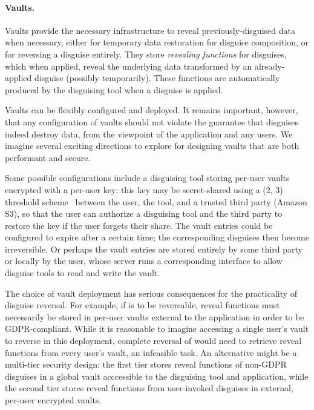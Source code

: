 
\paragraph{Vaults.}

Vaults provide the necessary infrastructure to reveal previously-disguised data when
necessary, either for temporary data restoration for disguise composition, or for reversing a disguise
entirely.
%
They store \emph{revealing functions} for disguises, which when applied, reveal the underlying
data transformed by an already-applied disguise (possibly temporarily). These functions are
automatically produced by the disguising tool when a disguise is applied.
%

%
Vaults can be flexibly configured and deployed. It remains important, however, that any
configuration of vaults should not violate the guarantee that disguises indeed destroy data,
from the viewpoint of the application and any users.
We imagine several exciting directions to explore for designing vaults that are both
performant and secure.
%

%
Some possible configurations include a disguising tool storing per-user vaults encrypted with a per-user key; this key
may be secret-shared using a (2, 3) threshold scheme~\cite{secretsharing} between the user, the
tool, and a trusted third party (\eg Amazon S3), so that the user can authorize a disguising tool and the
third party to restore the key if the user forgets their share.
%
The vault entries could be configured to expire after a certain time; the corresponding disguises
then become irreversible.
%
Or perhaps the vault entries are stored entirely by some third party or locally by the user, whose
server runs a corresponding interface to allow disguise tools to read and write the vault.

The choice of vault deployment has serious consequences for the practicality of disguise reversal.
For example, if \gdpr is to be reversable, reveal functions must necessarily be stored in per-user
vaults external to the application in order to be GDPR-compliant.  While it is reasonable to imagine
accessing a single user's vault to reverse \gdpr in this deployment, complete reversal of \ca would
need to retrieve reveal functions from every user's vault, an infeasible task.
%
An alternative might be a multi-tier security design: the first tier stores reveal functions of
non-GDPR disguises in a global vault acccessible to the disguising tool and application, while the
second tier stores reveal functions from user-invoked disguises in external, per-user encrypted
vaults.

